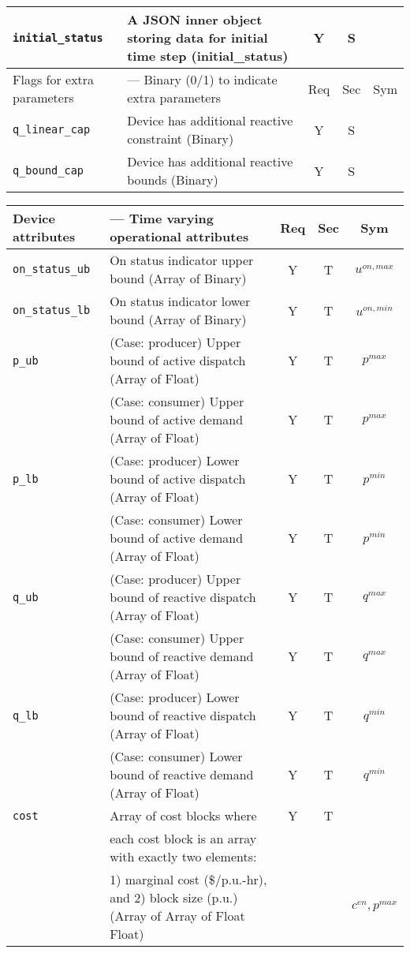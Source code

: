 \documentclass{article}
\begin{document}
\begin{center}
\begin{tabular}{ l | l | c | c | c |}
  {\tt initial\_status} & A JSON inner object storing data for initial time step (initial\_status) & Y & S &  \\
  \hline
  Flags for extra parameters & --- Binary (0/1) to indicate extra parameters & Req & Sec & Sym\\
   \hline
  {\tt q\_linear\_cap}      & Device has additional reactive constraint (Binary) & Y & S & \\
  {\tt q\_bound\_cap}       & Device has additional reactive bounds (Binary) & Y & S & \\
  \hline
\end{tabular}
\end{center}

\begin{center}
\small
\begin{tabular}{ l | l | c | c | c |}
Device attributes & --- Time varying operational attributes &Req &Sec &Sym \\
\hline
  {\tt on\_status\_ub} & {On status indicator upper bound (Array of Binary)} & Y & T & $u^{on,max}$\\
  {\tt on\_status\_lb} & {On status indicator lower bound (Array of Binary)} & Y & T & $u^{on,min}$\\
  {\tt p\_ub} & { (Case: producer) Upper bound of active dispatch (Array of Float)   }& Y & T & $p^{max}$ \\
              & { (Case: consumer) Upper bound of active demand   (Array of Float)    }& Y & T & $p^{max}$ \\
  {\tt p\_lb} & { (Case: producer) Lower bound of active dispatch (Array of Float)    }& Y & T & $p^{min}$ \\
              & { (Case: consumer) Lower bound of active demand   (Array of Float)    }& Y & T & $p^{min}$ \\
  {\tt q\_ub} & { (Case: producer) Upper bound of reactive dispatch (Array of Float)  }& Y & T & $q^{max}$\\
              & { (Case: consumer) Upper bound of reactive demand   (Array of Float)  }& Y & T & $q^{max}$\\
  {\tt q\_lb} & { (Case: producer) Lower bound of reactive dispatch (Array of Float)  }& Y & T & $q^{min}$\\
              & { (Case: consumer) Lower bound of reactive demand   (Array of Float)  }& Y & T & $q^{min}$\\

  {\tt cost} &  Array of cost blocks where & Y & T &  \\
    &  each cost block is an array with exactly two elements:   &  &   &  \\
    &  1) marginal  cost (\$/p.u.-hr), and 2) block size (p.u.) (Array of Array of Float Float)&  &   &$c^{en}, p^{max}$ \\
\hline
\end{tabular}
\end{center}
\end{document}
